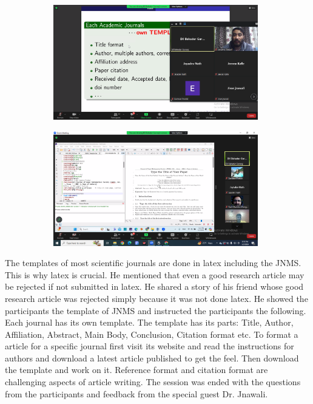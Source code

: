 \message{ !name(latexworkhop_report.tex)}\documentclass[a4paper,12pt]{report}
\begin{document}
\begin{figure}[h!]
\centering
\begin{subfigure}{0.45\textwidth}
    \includegraphics[height=5cm, width=\textwidth]{online1.png}
\end{subfigure}
\hfill
\begin{subfigure}{0.45\textwidth}
    \includegraphics[height=5cm, width=\textwidth]{online2.png}
\end{subfigure}
\end{figure}

The templates of most scientific journals are done in latex including the JNMS. This is why latex is crucial. He mentioned that even a good research article may be rejected if not submitted in latex. He shared a story of his friend whose good research article was rejected simply because it was not done latex. He showed the participants the template of JNMS and instructed the participants the following.
Each journal has its own template. The template has its parts: Title, Author, Affiliation, Abstract, Main Body, Conclusion, Citation format etc. To format a article for a specific journal first visit its website and read the instructions for authors and download a latest article published to get the feel. Then download the template and work on it. Reference format and citation format are challenging aspects of article writing.
The session was ended with the questions from the participants and feedback from the special guest Dr. Jnawali.
\end{document}
